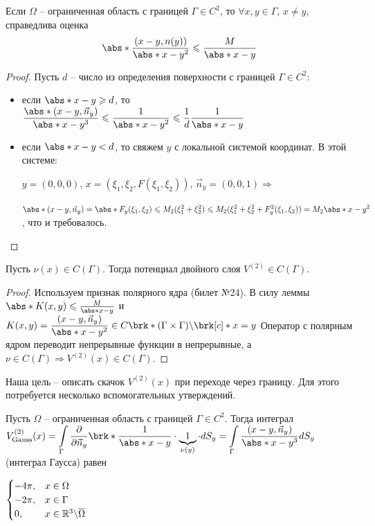 \begin{lemma}
Если $\Omega$ -- ограниченная область с границей $\Gamma \in C^2$, то $\forall x,y\in\Gamma, \, x\neq y$, справедлива оценка $$\abs*{\frac{(x-y,n(y))}{\abs*{x-y}^2}}\leq\frac{M}{\abs*{x-y}}$$
\end{lemma}
\begin{proof}
Пусть $d$ -- число из определения поверхности с границей $\Gamma \in C^2$:
\begin{itemize}[noitemsep]
\item если $\displaystyle  \abs*{x-y}\geq d$, то $\displaystyle \frac{\abs*{(x-y,\vec{n}_y)}}{\abs*{x-y}^3} \leq \frac{1}{\abs*{x-y}^2} \leq \frac{1}{d}\frac{1}{\abs*{x-y}}$
\item если $\abs*{x-y} < d$, то свяжем $y$ с локальной системой координат. В этой системе: 
\

$\displaystyle y=(0,0,0)$, $x = (\xi_1,\xi_2, F(\xi_1, \xi_2))$, $\vec{n}_y = (0,0,1) \Rightarrow$
\

 $\displaystyle \abs*{(x-y, \vec{n}_y)} = \abs*{F_y(\xi_1, \xi_2)} \leq M_2(\xi_1^2+\xi_2^2)\leq M_2(\xi_1^2+\xi_2^2 + F_y^2(\xi_1, \xi_2)) = M_2\abs*{x-y}^2$, что и требовалось.
\end{itemize}
\end{proof}
\begin{lemma}
Пусть $\nu(x) \in C(\Gamma)$. Тогда потенциал двойного слоя $V^{(2)} \in C(\Gamma)$.
\end{lemma}

\begin{proof}
Используем признак полярного ядра (билет №24). В силу леммы $\abs*{K(x,y)} \leq \frac{M}{\abs*{x-y}}$ и 
\
$K(x,y) = \displaystyle \frac{(x-y, \vec{n}_y)}{\abs*{x-y}^2}\in C\brk*{(\Gamma\times\Gamma)\backslash \brk[c]*{x=y}}$
Оператор с полярным ядром переводит непрерывные функции в непрерывные, а $\nu \in C(\Gamma) \Rightarrow V^{(2)}(x)\in C(\Gamma)$.

\end{proof}
Наша цель -- описать скачок $V^{(2)}(x)$ при переходе через границу. Для этого потребуется несколько вспомогательных утверждений.
\begin{lemma}
Пусть $\Omega$ -- ограниченная область с границей $\Gamma\in C^2$. Тогда интеграл $\displaystyle V^{(2)}_{\text{Gauss}}(x) = 
\int\limits_{\Gamma} \frac{\partial}{\partial\vec{n}_y}\brk*{\frac{1}{\abs*{x-y}}}\cdot \underbrace{1}_{\nu(y) } \cdot dS_y = \int\limits_{\Gamma} \dfrac{(x-y, \vec{n}_y)}{\abs*{x-y}^3} dS_y$ (интеграл Гаусса) равен 

$\begin{cases} 
-4\pi,  & x\in \Omega \\
-2\pi, &x\in \Gamma \\ 
0, &x\in\mathbb{R}^3\backslash \overline{\Omega}
\end{cases}$
\end{lemma}

